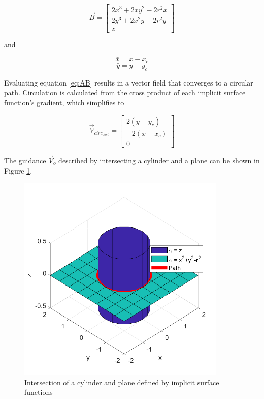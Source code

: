 \documentclass[numbered,pdftex]{ohio-etd}
\begin{document}
\begin{equation}
\overrightarrow{B} = \begin{bmatrix} 2\bar{x}^3+2\bar{x}\bar{y}^2-2r^2\bar{x} \\ 2\bar{y}^3+2\bar{x}^2\bar{y}-2r^2\bar{y} \\z \end{bmatrix}
\end{equation}

\noindent
and


\begin{equation}
\bar{x} = x - x_c
\end{equation}
\begin{equation}
\bar{y} = y - y_c
\end{equation}


Evaluating equation \ref{eq:AB} results in a vector field that converges to a circular path. Circulation is calculated from the cross product of each implicit surface function's gradient, which simplifies to



\begin{equation}
\label{eq:vcirc_circle}
\overrightarrow{V}_{circ_{obst}} =  \begin{bmatrix}  2(y-y_c) \\[6pt] -2(x-x_c) \\[6pt] 0\end{bmatrix}
\end{equation}

The guidance $\overrightarrow{V}_o$ described by intersecting a cylinder and a plane can be shown in Figure \ref{fig:cylinderIntersection}. 

\begin{figure}[H]
	\centering
	\includegraphics[width=10cm]{Figures/cylinderIntersection}
	\caption{Intersection of a cylinder and plane defined by implicit surface functions}
	\label{fig:cylinderIntersection}
\end{figure}
\end{document}
